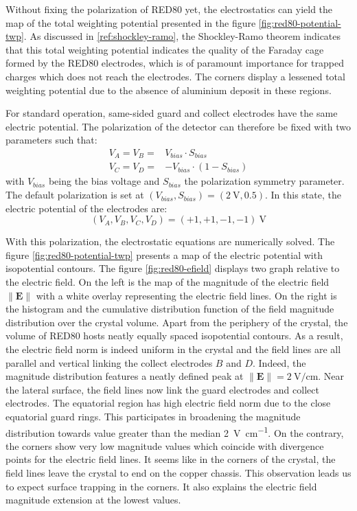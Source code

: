 Without fixing the polarization of RED80 yet, the electrostatics can yield the map of the total weighting potential presented in the figure \ref{fig:red80-potential-twp}.  As discussed in \ref{ref:shockley-ramo}, the Shockley-Ramo theorem indicates that this total weighting potential indicates the quality of the Faraday cage formed by the RED80 electrodes, which is of paramount importance for trapped charges which does not reach the electrodes.
The corners display a lessened total weighting potential due to the absence of aluminium deposit in these regions.

For standard operation, same-sided guard and collect electrodes have the same electric potential. The polarization of the detector can therefore be fixed with two parameters such that:
\begin{align}
V_A = V_B = & V_{bias} \cdot S_{bias} \\
V_C = V_D = & - V_{bias} \cdot \left( 1 - S_{bias} \right)
\end{align}
with $V_{bias}$ being the bias voltage and $S_{bias}$ the polarization symmetry parameter.
The default polarization is set at $\left( V_{bias}, S_{bias} \right) = (\SI{2}{\volt}, 0.5)$. In this state, the electric potential of the electrodes are:
\begin{equation}
(V_A, V_B, V_C, V_D) = (+1, +1, -1, -1)\ \si{\volt}
\end{equation}

With this polarization, the electrostatic equations are numerically solved. The figure \ref{fig:red80-potential-twp} presents a map of the electric potential with isopotential contours. The  figure \ref{fig:red80-efield} displays two graph relative to the electric field. On the left is the map of the magnitude of the electric field $\| \bm{E} \|$ with a white overlay representing the electric field lines. On the right is the histogram and the cumulative distribution function of the field magnitude distribution over the crystal volume.
Apart from the periphery of the crystal, the volume of RED80 hosts neatly equally spaced isopotential contours. As a result, the electric field norm is indeed uniform in the crystal and the field lines are all parallel and vertical linking the collect electrodes $B$ and $D$. Indeed, the magnitude distribution features a neatly defined peak at $\| \bm{E} \| = \SI{2}{\volt\per\centi\meter}$.
Near the lateral surface, the field lines now link the guard electrodes and collect electrodes. The equatorial region has high electric field norm due to the close equatorial guard rings. This participates in broadening the magnitude distribution towards value greater than the median \SI{2}{\volt\per\centi\meter}.
On the contrary, the corners show very low magnitude values which coincide with divergence points for the electric field lines. It seems like in the corners of the crystal, the field lines leave the crystal to end on the copper chassis. This observation leads us to expect surface trapping in the corners. It also explains the electric field magnitude extension at the lowest values.

